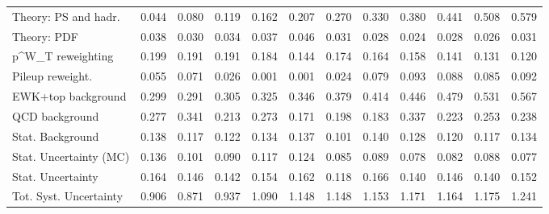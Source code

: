 \begin{tabular}{l|p{0.6cm}p{0.6cm}p{0.6cm}p{0.6cm}p{0.6cm}p{0.6cm}p{0.6cm}p{0.6cm}p{0.6cm}p{0.6cm}p{0.6cm}}
Theory: PS and hadr.                     & 0.044 & 0.080 & 0.119 & 0.162 & 0.207 & 0.270 & 0.330 & 0.380 & 0.441 & 0.508 & 0.579 \\
Theory: PDF                              & 0.038 & 0.030 & 0.034 & 0.037 & 0.046 & 0.031 & 0.028 & 0.024 & 0.028 & 0.026 & 0.031 \\
p^{W}_{T} reweighting                    & 0.199 & 0.191 & 0.191 & 0.184 & 0.144 & 0.174 & 0.164 & 0.158 & 0.141 & 0.131 & 0.120 \\
Pileup reweight.                         & 0.055 & 0.071 & 0.026 & 0.001 & 0.001 & 0.024 & 0.079 & 0.093 & 0.088 & 0.085 & 0.092 \\
EWK+top background                       & 0.299 & 0.291 & 0.305 & 0.325 & 0.346 & 0.379 & 0.414 & 0.446 & 0.479 & 0.531 & 0.567 \\
QCD background                           & 0.277 & 0.341 & 0.213 & 0.273 & 0.171 & 0.198 & 0.183 & 0.337 & 0.223 & 0.253 & 0.238 \\
Stat. Background                         & 0.138 & 0.117 & 0.122 & 0.134 & 0.137 & 0.101 & 0.140 & 0.128 & 0.120 & 0.117 & 0.134 \\
Stat. Uncertainty (MC)                   & 0.136 & 0.101 & 0.090 & 0.117 & 0.124 & 0.085 & 0.089 & 0.078 & 0.082 & 0.088 & 0.077 \\
\hline
Stat. Uncertainty                        & 0.164 & 0.146 & 0.142 & 0.154 & 0.162 & 0.118 & 0.166 & 0.140 & 0.146 & 0.140 & 0.152 \\
\hline
Tot. Syst. Uncertainty                   & 0.906 & 0.871 & 0.937 & 1.090 & 1.148 & 1.148 & 1.153 & 1.171 & 1.164 & 1.175 & 1.241 \\
\hline
\end{tabular}

